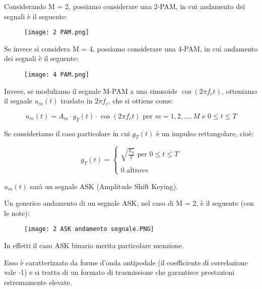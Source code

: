 Considerando M = 2, 
possiamo considerare una 2-PAM, in cui andamento dei segnali è il seguente: 

\begin{figure}[h]
    \centering
    \texttt{[image: 2 PAM.png]}
\end{figure}

Se invece si considera M = 4, 
possiamo considerare una 4-PAM, in cui andamento dei segnali è il seguente: 

\begin{figure}[h]
    \centering
    \texttt{[image: 4 PAM.png]}
\end{figure}

Invece, se moduliamo il segnale M-PAM a una sinusoide $\cos(2 \pi f_c t)$, 
otteniamo il segnale $u_m (t)$ traslato in $2 \pi f_c$, 
che si ottiene come: 

{
    \Large 
    \begin{equation}
        u_m (t)
        =
        A_m \cdot g_T (t) \cdot \cos(2 \pi f_c t) \text{ per } m = 1, 2, \dots, M \text{ e } 0 \le t \le T
    \end{equation}
}

Se consideriamo il caso particolare in cui $g_T (t)$ è un impulso rettangolare, cioè: 

{
    \Large 
    \begin{equation}
        g_T (t)
        = 
        \begin{cases}
            \sqrt{\frac{E_g}{T}} \text{ per } 0 \le t \le T 
            \\
            \quad
            \\
            0 \text{ altrove}
        \end{cases}
    \end{equation}
}

$u_m (t)$ sarà un segnale ASK (Amplitude Shift Keying). \newline 

\newpage 

Un generico andamento di un segnale ASK, nel caso di M = 2, è il seguente (con le note): 

\begin{figure}[h]
    \centering
    \texttt{[image: 2 ASK andamento segnale.PNG]}
\end{figure}

In effetti il caso ASK binario merita particolare menzione. \newline 

Esso è caratterizzato da forme d'onda antipodale (il coefficiente di correlazione vale -1) e si tratta di un formato di trasmissione che garantisce prestazioni estremamente elevate. \newline 

